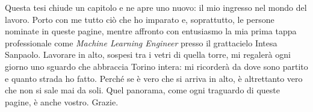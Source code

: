 Questa tesi chiude un capitolo e ne apre uno nuovo: il mio ingresso nel mondo del lavoro. Porto con me tutto ciò che ho imparato e, soprattutto, le persone nominate in queste pagine, mentre affronto con entusiasmo la mia prima tappa professionale come \emph{Machine Learning Engineer} presso il grattacielo Intesa Sanpaolo. Lavorare in alto, sospesi tra i vetri di quella torre, mi regalerà ogni giorno uno sguardo che abbraccia Torino intera: mi ricorderà da dove sono partito e quanto strada ho fatto. Perché se è vero che si arriva in alto, è altrettanto vero che non si sale mai da soli. Quel panorama, come ogni traguardo di queste pagine, è anche vostro. Grazie.

\endgroup
\vspace*{5\baselineskip}
